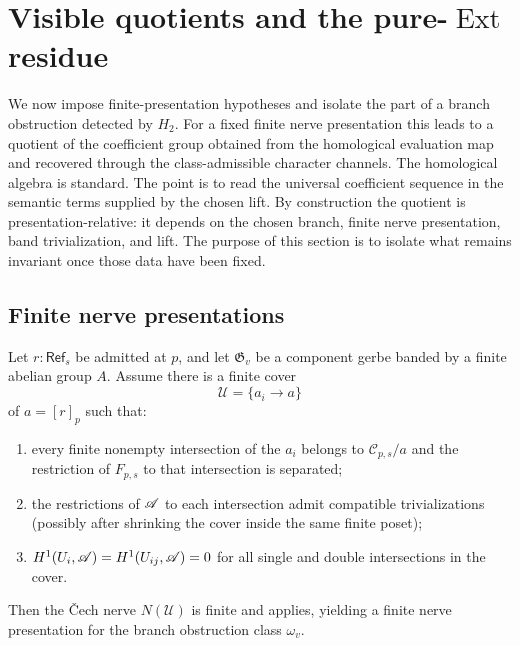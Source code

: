 \section{Visible quotients and the pure-\texorpdfstring{$\operatorname{Ext}$}{Ext} residue}\label{sec:homological-visibility}

We now impose finite-presentation hypotheses and isolate the part of a branch obstruction detected by $H_2$. For a fixed finite nerve presentation this leads to a quotient of the coefficient group obtained from the homological evaluation map and recovered through the class-admissible character channels. The homological algebra is standard. The point is to read the universal coefficient sequence in the semantic terms supplied by the chosen lift. By construction the quotient is presentation-relative: it depends on the chosen branch, finite nerve presentation, band trivialization, and lift. The purpose of this section is to isolate what remains invariant once those data have been fixed.

\subsection{Finite nerve presentations}\label{subsec:finite-nerve-criteria}

\begin{lemma}\label{lem:finite-nerve-criterion}
Let $r:\mathsf{Ref}_s$ be admitted at $p$, and let $\mathfrak G_v$ be a component gerbe banded by a finite abelian group $A$. Assume there is a finite cover
\[
\mathcal U=\{a_i\to a\}
\]
of $a=[r]_p$ such that:
\begin{enumerate}[label=(\roman*),nosep]
\item every finite nonempty intersection of the $a_i$ belongs to $\mathcal C_{p,s}/a$ and the restriction of $F_{p,s}$ to that intersection is separated;
\item the restrictions of $\mathscr{A}$ to each intersection admit compatible trivializations (possibly after shrinking the cover inside the same finite poset);
\item $H^1(U_i,\mathscr{A})=H^1(U_{ij},\mathscr{A})=0$ for all single and double intersections in the cover.
\end{enumerate}
Then the \v{C}ech nerve $N(\mathcal U)$ is finite and  applies, yielding a finite nerve presentation for the branch obstruction class $\omega_v$.
\end{lemma}

